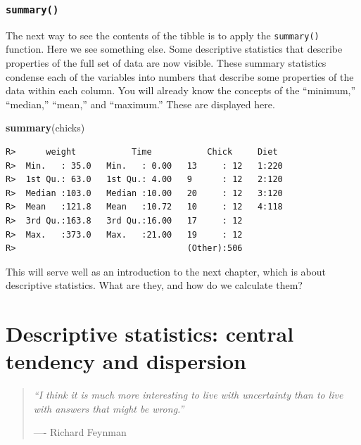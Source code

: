\documentclass[english,10pt,a4paper,oneside]{book}
\newenvironment{Shaded}{\begin{snugshade}}{\end{snugshade}}
\newcommand{\KeywordTok}[1]{\textcolor[rgb]{0.13,0.29,0.53}{\textbf{#1}}}
\newcommand{\NormalTok}[1]{#1}
\theoremstyle{definition}
\theoremstyle{definition}
\theoremstyle{definition}
\theoremstyle{remark}
\begin{document}
\hypertarget{summary}{%
\subsection{\texorpdfstring{\texttt{summary()}}{summary()}}\label{summary}}

The next way to see the contents of the tibble is to apply the
\texttt{summary()} function. Here we see something else. Some
descriptive statistics that describe properties of the full set of data
are now visible. These summary statistics condense each of the variables
into numbers that describe some properties of the data within each
column. You will already know the concepts of the \enquote{minimum,}
\enquote{median,} \enquote{mean,} and \enquote{maximum.} These are
displayed here.

\begin{Shaded}
\begin{Highlighting}[]
\KeywordTok{summary}\NormalTok{(chicks)}
\end{Highlighting}
\end{Shaded}

\begin{verbatim}
R>      weight           Time           Chick     Diet   
R>  Min.   : 35.0   Min.   : 0.00   13     : 12   1:220  
R>  1st Qu.: 63.0   1st Qu.: 4.00   9      : 12   2:120  
R>  Median :103.0   Median :10.00   20     : 12   3:120  
R>  Mean   :121.8   Mean   :10.72   10     : 12   4:118  
R>  3rd Qu.:163.8   3rd Qu.:16.00   17     : 12          
R>  Max.   :373.0   Max.   :21.00   19     : 12          
R>                                  (Other):506
\end{verbatim}

This will serve well as an introduction to the next chapter, which is
about descriptive statistics. What are they, and how do we calculate
them?

\hypertarget{descriptive-statistics-central-tendency-and-dispersion}{%
\chapter{Descriptive statistics: central tendency and
dispersion}\label{descriptive-statistics-central-tendency-and-dispersion}}

\begin{quote}
\emph{\enquote{I think it is much more interesting to live with
uncertainty than to live with answers that might be wrong.}}

---- Richard Feynman
\end{quote}
\end{document}
